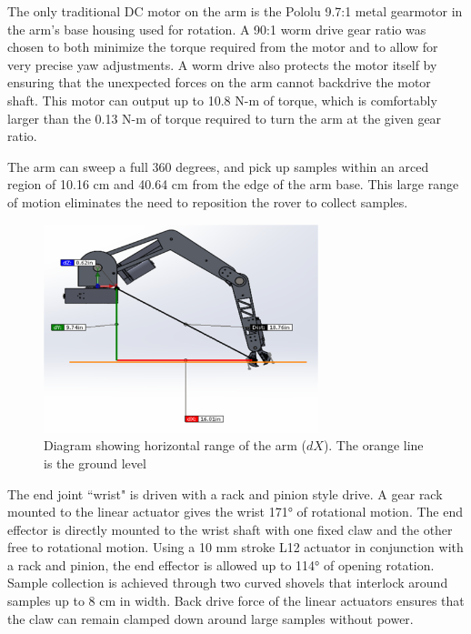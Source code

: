 \documentclass[titlepage,twocolumn,10pt]{article}
\begin{document}
    The only traditional DC motor on the arm is the Pololu 9.7:1 metal gearmotor in the arm's base housing used for rotation. A 90:1 worm drive gear ratio was chosen to both minimize the torque required from the motor and to allow for very precise yaw adjustments. A worm drive also protects the motor itself by ensuring that the unexpected forces on the arm cannot backdrive the motor shaft. This motor can output up to 10.8 N-m of torque, which is comfortably larger than the 0.13 N-m of torque required to turn the arm at the given gear ratio. 
    
    The arm can sweep a full 360 degrees, and pick up samples within an arced region of 10.16 cm and 40.64 cm from the edge of the arm base. This large range of motion eliminates the need to reposition the rover to collect samples.

    \begin{figure}[H]
        \centering
        \includegraphics*[width = 8cm]{images/manipdim.png}
        \caption{Diagram showing horizontal range of the arm ($dX$). The orange line is the ground level}
    \end{figure}

    The end joint ``wrist" is driven with a rack and pinion style drive. A gear rack mounted to the linear actuator gives the wrist 171° of rotational motion. The end effector is directly mounted to the wrist shaft with one fixed claw and the other free to rotational motion. Using a 10 mm stroke L12 actuator in conjunction with a rack and pinion, the end effector is allowed up to 114° of opening rotation. Sample collection is achieved through two curved shovels that interlock around samples up to 8 cm in width. Back drive force of the linear actuators ensures that the claw can remain clamped down around large samples without power.
    
\end{document}
